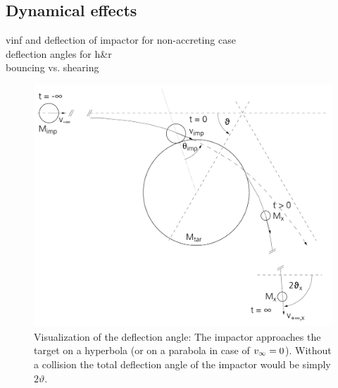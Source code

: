 \subsection{Dynamical effects}
vinf and deflection of impactor for non-accreting case\\
deflection angles for h\&r \\
bouncing vs. shearing \\

\begin{figure}[htbp]
\begin{center}
\includegraphics[scale=0.5]{04_vartheta}
\caption{Visualization of the deflection angle: The impactor approaches the target on a hyperbola (or on a parabola in case of $v_{\infty} = 0$). Without a collision the total deflection angle of the impactor would be simply $2 \vartheta$.}
\label{ch03_fig02}
\end{center}
\end{figure}

